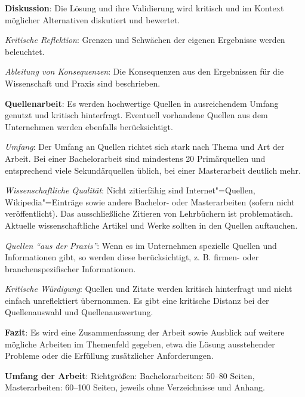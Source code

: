 \begin{checklist}
\begin{checklist}
    \end{checklist}
  \item \textbf{Diskussion}: Die Lösung und ihre Validierung wird kritisch und im Kontext möglicher Alternativen diskutiert und bewertet.
    \begin{checklist}
        \item \textit{Kritische Reflektion}: Grenzen und Schwächen der eigenen Ergebnisse werden beleuchtet.
        \item \textit{Ableitung von Konsequenzen}: Die Konsequenzen aus den Ergebnissen für die Wissenschaft und Praxis sind beschrieben.
    \end{checklist}
  \item \textbf{Quellenarbeit}: Es werden hochwertige Quellen in ausreichendem Umfang genutzt und kritisch hinterfragt. Eventuell vorhandene Quellen aus dem Unternehmen werden ebenfalls berücksichtigt.
    \begin{checklist}
        \item \textit{Umfang}: Der Umfang an Quellen richtet sich stark nach Thema und Art der Arbeit. Bei einer Bachelorarbeit sind mindestens 20 Primärquellen und entsprechend viele Sekundärquellen üblich, bei einer Masterarbeit deutlich mehr.
        \item \textit{Wissenschaftliche Qualität}: Nicht zitierfähig sind Internet"=Quellen, Wikipedia"=Einträge sowie andere Bachelor- oder Masterarbeiten (sofern nicht veröffentlicht). Das ausschließliche Zitieren von Lehrbüchern ist problematisch. Aktuelle wissenschaftliche Artikel und Werke sollten in den Quellen auftauchen.
        \item \textit{Quellen \enquote{aus der Praxis}}: Wenn es im Unternehmen spezielle Quellen und Informationen gibt, so werden diese berücksichtigt, z. B. firmen- oder branchenspezifischer Informationen.
        \item \textit{Kritische Würdigung}: Quellen und Zitate werden kritisch hinterfragt und nicht einfach unreflektiert übernommen. Es gibt eine kritische Distanz bei der Quellenauswahl und Quellenauswertung.
    \end{checklist}
  \item \textbf{Fazit}: Es wird eine Zusammenfassung der Arbeit sowie Ausblick auf weitere mögliche Arbeiten im Themenfeld gegeben, etwa die Lösung ausstehender Probleme oder die Erfüllung zusätzlicher Anforderungen.
  \item \textbf{Umfang der Arbeit}: Richtgrößen: Bachelorarbeiten: 50--80 Seiten, Masterarbeiten: 60--100 Seiten, jeweils ohne Verzeichnisse und Anhang.
\end{checklist}

